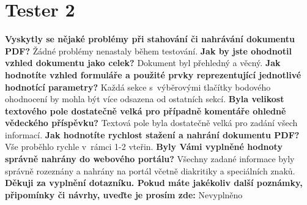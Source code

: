 \section{Tester 2}

\textbf{Vyskytly se nějaké problémy při stahování či nahrávání dokumentu PDF?}
\newline
Žádné problémy nenastaly během testování.
\newline
\newline
\textbf{Jak by jste ohodnotil vzhled dokumentu jako celek?}
\newline
Dokument byl přehledný a věcný.
\newline
\newline
\textbf{Jak hodnotíte vzhled formuláře a použité prvky reprezentující jednotlivé hodnotící parametry?}
\newline
Každá sekce s~výběrovými tlačítky bodového ohodnocení by mohla být více odsazena od ostatních sekcí.
\newline
\newline
\textbf{Byla velikost textového pole dostatečně velká pro případně komentáře ohledně vědeckého příspěvku?}
\newline
Textová pole byla dostatečně velká pro zadání všech informací.
\newline
\newline
\textbf{Jak hodnotíte rychlost stažení a nahrání dokumentu PDF?} 
\newline
Vše proběhlo rychle v~rámci 1-2 vteřin.
\newline
\newline
\textbf{Byly Vámi vyplněné hodnoty správně nahrány do webového portálu?}
\newline
Všechny zadané informace byly správně rozeznány a nahrány na portál včetně diakritiky a speciálních znaků.
\newline
\newline
\textbf{Děkuji za vyplnění dotazníku. Pokud máte jakékoliv další poznámky, připomínky či návrhy, uveďte je prosím zde:}
\newline
Nevyplněno
\newpage 
